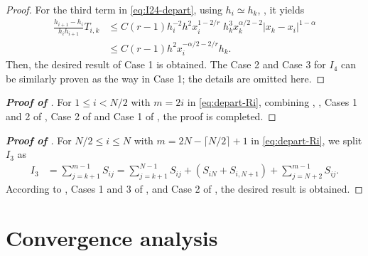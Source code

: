 \documentclass{amsart}
\theoremstyle{definition}
\theoremstyle{remark}
\numberwithin{equation}{section}
\begin{document}
\begin{proof}
For the third term in \eqref{eq:I24-depart}, using $h_i \simeq h_k$, , it yields
\begin{equation*}
  \begin{aligned}
    \frac{h_{i+1}-h_{i}}{h_i h_{i+1}} T_{i,k}
     & \le C(r-1) h_i^{-2} h^2 x_i^{1-2/r} \; h_k^3 x_{k}^{\alpha/2-2} |x_{k}-x_i|^{1-\alpha} \\
     & \le C(r-1) h^2 x_i^{-\alpha/2-2/r} h_k.
  \end{aligned}
\end{equation*}
Then, the desired result of Case 1 is obtained.
The Case 2 and Case 3 for \(I_4\) can be similarly proven as the way in Case 1; the details are omitted here.
\end{proof}




\begin{proof} [\bf Proof of ]
For \(1\le i < N/2\) 
with $m=2i$ in \eqref{eq:depart-Ri}, 
combining
, 
, 
Cases 1 and 2 of , 
Case 2 of  and
Case 1 of , 
the proof is completed.
\end{proof}

\begin{proof} [\bf Proof of ]
For \(N/2 \le i \le N \) 
with $m=2N-\lceil N/2 \rceil +1$ in \eqref{eq:depart-Ri},
we split \(I_3\) as
 \begin{equation} \label{eq:I3-depart}
  \begin{aligned}
    I_3 &= \sum_{j=k+1}^{m-1} S_{ij}
         = \sum_{j=k+1}^{N-1} S_{ij} + (S_{iN}+S_{i,N+1}) + \sum_{j=N+2}^{m-1}  S_{ij}.
  \end{aligned}
\end{equation}
According to
, 
Cases 1 and 3 of , 
and 
Case 2 of , 
the desired result is obtained.
\end{proof}




\section{Convergence analysis}
\label{sec:proof-convergence}
\end{document}

